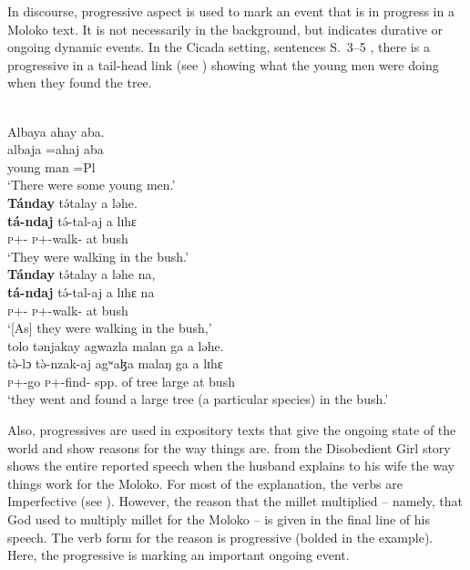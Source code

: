 In discourse, progressive aspect is used to mark an event that is in progress in a Moloko text. It is not necessarily in the background, but indicates durative or ongoing dynamic events. In the Cicada setting, sentences S.~3--5 , there is a progressive in a tail-head link (see ) showing what the young men were doing when they found the tree. 

\ea \label{ex:8:28}\\
Albaya  ahay  aba.\\   
\gll  albaja  =ahaj    aba\\
      {young man}    =Pl     {\EXT}\\
\glt  ‘There were some young men.’\\
\medskip
\textbf{Tánday} t\'{ə}talay  a  ləhe. \\ 
\gll  \textbf{tá-ndaj} t\'{ə}-tal-aj a lɪhɛ\\
      \textsc{p}+{\IFV}-{\PRG} \textsc{p}+{\IFV}-walk{}-{\CL}  at    bush\\
\glt  ‘They were walking in the bush.’\\
\medskip
\textbf{Tánday}  t\'{ə}talay  a  ləhe  na, \\
\gll  \textbf{tá-ndaj} t\'{ə}-tal-aj a lɪhɛ na\\
      \textsc{p}+{\IFV}-{\PRG}   \textsc{p}+{\IFV}-walk{}-{\CL}  at   bush   {\PSP}\\
\glt  ‘[As] they were walking in the bush,’\\
\medskip
tolo  tənjakay  agwazla  malan  ga  a  ləhe.\\
\gll  t\`{ə}-lɔ t\`{ə}-nzak-aj agʷaɮa malaŋ ga a lɪhɛ\\
      \textsc{p}+{\PFV}-go  \textsc{p}+{\PFV}-find{}-{\CL}    {spp. of tree}      large   {\ADJ}    at    bush\\
\glt  ‘they went and found a large tree (a particular species) in the bush.’
\z

Also, progressives are used in expository texts that give the ongoing state of the world and show reasons for the way things are.  from the Disobedient Girl story shows the entire reported speech when the husband explains to his wife the way things work for the Moloko. For most of the explanation, the verbs are Imperfective (see ). However, the reason that the millet multiplied -- namely, that God used to multiply millet for the Moloko -- is given in the final line of his speech. The verb form for the reason is progressive (bolded in the example). Here, the progressive is marking an important ongoing event. 

